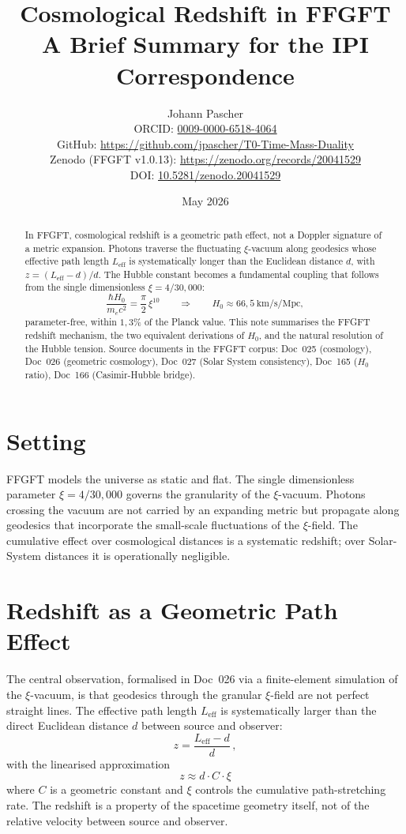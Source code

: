 \documentclass[11pt,a4paper]{article}
\title{Cosmological Redshift in FFGFT\\[2pt]
  \large A Brief Summary for the IPI Correspondence}
\author{Johann Pascher\\[2pt]
\small ORCID: \href{https://orcid.org/0009-0000-6518-4064}{0009-0000-6518-4064}\\
\small GitHub: \url{https://github.com/jpascher/T0-Time-Mass-Duality}\\
\small Zenodo (FFGFT v1.0.13): \url{https://zenodo.org/records/20041529}\\
\small DOI: \href{https://doi.org/10.5281/zenodo.20041529}{10.5281/zenodo.20041529}}
\date{May 2026}
\begin{document}
\maketitle

\begin{abstract}
\noindent In FFGFT, cosmological redshift is a geometric path effect, not a Doppler signature of a metric expansion. Photons traverse the fluctuating $\xi$-vacuum along geodesics whose effective path length $L_{\mathrm{eff}}$ is systematically longer than the Euclidean distance $d$, with $z = (L_{\mathrm{eff}} - d)/d$. The Hubble constant becomes a fundamental coupling that follows from the single dimensionless $\xi = 4/30{,}000$:
\[
\frac{\hbar H_0}{m_e c^2} = \frac{\pi}{2}\,\xi^{10} \qquad\Longrightarrow\qquad H_0 \approx 66{,}5\ \text{km/s/Mpc},
\]
parameter-free, within $1{,}3\%$ of the Planck value. This note summarises the FFGFT redshift mechanism, the two equivalent derivations of $H_0$, and the natural resolution of the Hubble tension. Source documents in the FFGFT corpus: Doc~025 (cosmology), Doc~026 (geometric cosmology), Doc~027 (Solar System consistency), Doc~165 ($H_0$ ratio), Doc~166 (Casimir-Hubble bridge).
\end{abstract}

\section{Setting}

FFGFT models the universe as static and flat. The single dimensionless parameter $\xi = 4/30{,}000$ governs the granularity of the $\xi$-vacuum. Photons crossing the vacuum are not carried by an expanding metric but propagate along geodesics that incorporate the small-scale fluctuations of the $\xi$-field. The cumulative effect over cosmological distances is a systematic redshift; over Solar-System distances it is operationally negligible.

\section{Redshift as a Geometric Path Effect}

The central observation, formalised in Doc~026 via a finite-element simulation of the $\xi$-vacuum, is that geodesics through the granular $\xi$-field are not perfect straight lines. The effective path length $L_{\mathrm{eff}}$ is systematically larger than the direct Euclidean distance $d$ between source and observer:
\begin{equation}
z = \frac{L_{\mathrm{eff}} - d}{d}\,,
\label{eq:z_geometric}
\end{equation}
with the linearised approximation
\begin{equation}
z \approx d \cdot C \cdot \xi
\label{eq:z_linear}
\end{equation}
where $C$ is a geometric constant and $\xi$ controls the cumulative path-stretching rate. The redshift is a property of the spacetime geometry itself, not of the relative velocity between source and observer.
\end{document}
